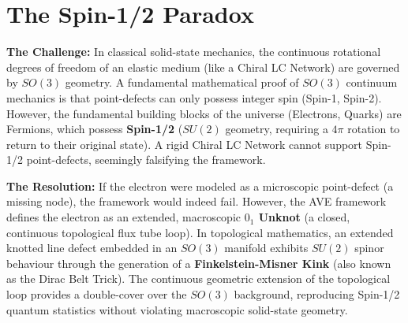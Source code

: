 \section{The Spin-1/2 Paradox}
\textbf{The Challenge:} In classical solid-state mechanics, the continuous rotational degrees of freedom of an elastic medium (like a Chiral LC Network) are governed by $SO(3)$ geometry. A fundamental mathematical proof of $SO(3)$ continuum mechanics is that point-defects can only possess integer spin (Spin-1, Spin-2). However, the fundamental building blocks of the universe (Electrons, Quarks) are Fermions, which possess \textbf{Spin-1/2} ($SU(2)$ geometry, requiring a $4\pi$ rotation to return to their original state). A rigid Chiral LC Network cannot support Spin-1/2 point-defects, seemingly falsifying the framework.

\textbf{The Resolution:} If the electron were modeled as a microscopic point-defect (a missing node), the framework would indeed fail. However, the AVE framework defines the electron as an extended, macroscopic \textbf{$0_1$ Unknot} (a closed, continuous topological flux tube loop). In topological mathematics, an extended knotted line defect embedded in an $SO(3)$ manifold exhibits $SU(2)$ spinor behaviour through the generation of a \textbf{Finkelstein-Misner Kink} (also known as the Dirac Belt Trick). The continuous geometric extension of the topological loop provides a double-cover over the $SO(3)$ background, reproducing Spin-1/2 quantum statistics without violating macroscopic solid-state geometry.

